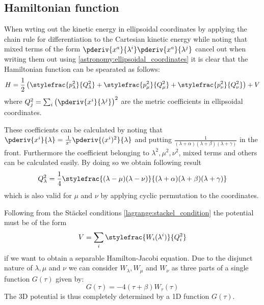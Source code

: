     \subsection{Hamiltonian function}
    When wrting out the kinetic energy in ellipsoidal coordinates by applying the chain rule for differentiation to the Cartesian kinetic energy while noting that mixed terms of the form $\pderiv{x^a}{\lambda^i}\pderiv{x^a}{\lambda^j}$ cancel out when writing them out using \ref{astronomy:ellipsoidal_coordinates} it is clear that the Hamiltonian function can be spearated as follows:
    \begin{equation}
    	H = \frac{1}{2}\left(\stylefrac{p_\lambda^2}{Q_\lambda^2} + \stylefrac{p_\mu^2}{Q_\mu^2} + \stylefrac{p_\nu^2}{Q_\nu^2}\right) + V
    \end{equation}
    where $Q_j^2 = \sum_i\left(\pderiv{x^i}{\lambda^j}\right)^2$ are the metric coefficients in ellipsoidal coordinates.
    
    These coefficients can be calculated by noting that $\pderiv{x^i}{\lambda} = \frac{1}{x^i}\pderiv{(x^i)^2}{\lambda}$ and putting $\frac{1}{(\lambda + \alpha)(\lambda + \beta)(\lambda + \gamma)}$ in the front. Furthermore the coefficient belonging to $\lambda^2, \mu^2, \nu^2$, mixed terms and others can be calculated easily. By doing so we obtain following result
    \begin{equation}
    	Q_\lambda^2 = \frac{1}{4}\stylefrac{(\lambda - \mu)(\lambda - \nu)}{(\lambda + \alpha)(\lambda + \beta)(\lambda + \gamma)}
    \end{equation}
    which is also valid for $\mu$ and $\nu$ by applying cyclic permutation to the coordinates.
    
    Following from the St\"ackel conditions \ref{lagrange:stackel_condition} the potential must be of the form
    \begin{equation}
    	V = \sum_i\stylefrac{W_i(\lambda^i)}{Q_i^2}
    \end{equation}
    if we want to obtain a separable Hamilton-Jacobi equation. Due to the disjunct nature of $\lambda, \mu$ and $\nu$ we can consider $W_\lambda, W_\mu$ and $W_\nu$ as three parts of a single function $G(\tau)$ given by:
    \begin{equation}
    	G(\tau) = -4(\tau + \beta)W_\tau(\tau)
    \end{equation}
    The 3D potential is thus completely determined by a 1D function $G(\tau)$.
    
